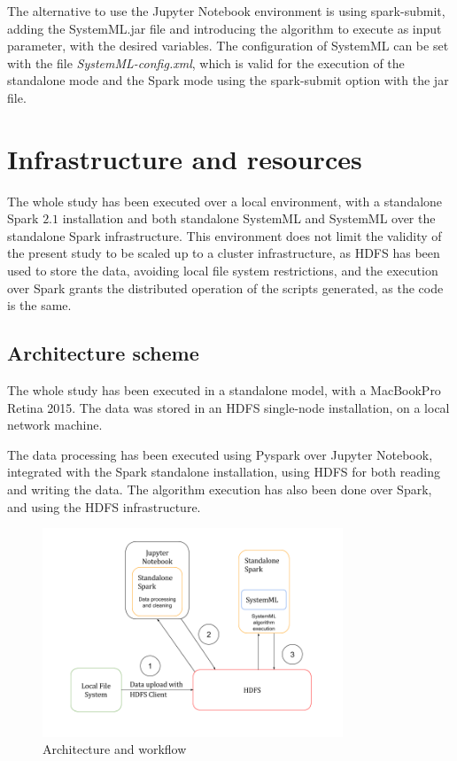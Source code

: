 \documentclass[11pt]{book} %
\begin{document}
    The alternative to use the Jupyter Notebook environment is using spark-submit, adding the SystemML.jar file and introducing the algorithm to execute as input parameter, with the desired variables. The configuration of SystemML can be set with the file \emph{SystemML-config.xml}, which is valid for the execution of the standalone mode and the Spark mode using the spark-submit option with the jar file.

\chapter{Infrastructure and resources}
  \label{sec:infrastructure_and_resources}

  The whole study has been executed over a local environment, with a standalone Spark $2.1$ installation and both standalone SystemML and SystemML over the standalone Spark infrastructure. This environment does not limit the validity of the present study to be scaled up to a cluster infrastructure, as HDFS has been used to store the data, avoiding local file system restrictions, and the execution over Spark grants the distributed operation of the scripts generated, as the code is the same.

  \section{Architecture scheme}

    The whole study has been executed in a standalone model, with a MacBookPro Retina 2015. The data was stored in an HDFS single-node installation, on a local network machine.

    The data processing has been executed using Pyspark over Jupyter Notebook, integrated with the Spark standalone installation, using HDFS for both reading and writing the data. The algorithm execution has also been done over Spark, and using the HDFS infrastructure.

    \begin{figure}
      \includegraphics[width=0.8\textwidth]{study_architecture.png}
      \caption{Architecture and workflow}
      \label{img:architecture_workflow}
    \end{figure}
\end{document}
